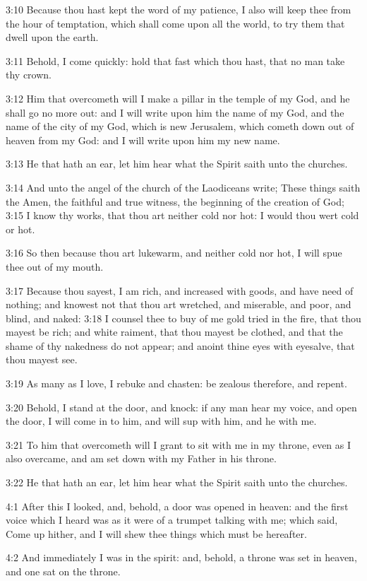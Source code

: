 3:10 Because thou hast kept the word of my patience, I also will keep
thee from the hour of temptation, which shall come upon all the world,
to try them that dwell upon the earth.

3:11 Behold, I come quickly: hold that fast which thou hast, that no
man take thy crown.

3:12 Him that overcometh will I make a pillar in the temple of my God,
and he shall go no more out: and I will write upon him the name of my
God, and the name of the city of my God, which is new Jerusalem, which
cometh down out of heaven from my God: and I will write upon him my
new name.

3:13 He that hath an ear, let him hear what the Spirit saith unto the
churches.

3:14 And unto the angel of the church of the Laodiceans write; These
things saith the Amen, the faithful and true witness, the beginning of
the creation of God; 3:15 I know thy works, that thou art neither cold
nor hot: I would thou wert cold or hot.

3:16 So then because thou art lukewarm, and neither cold nor hot, I
will spue thee out of my mouth.

3:17 Because thou sayest, I am rich, and increased with goods, and
have need of nothing; and knowest not that thou art wretched, and
miserable, and poor, and blind, and naked: 3:18 I counsel thee to buy
of me gold tried in the fire, that thou mayest be rich; and white
raiment, that thou mayest be clothed, and that the shame of thy
nakedness do not appear; and anoint thine eyes with eyesalve, that
thou mayest see.

3:19 As many as I love, I rebuke and chasten: be zealous therefore,
and repent.

3:20 Behold, I stand at the door, and knock: if any man hear my voice,
and open the door, I will come in to him, and will sup with him, and
he with me.

3:21 To him that overcometh will I grant to sit with me in my throne,
even as I also overcame, and am set down with my Father in his throne.

3:22 He that hath an ear, let him hear what the Spirit saith unto the
churches.

4:1 After this I looked, and, behold, a door was opened in heaven: and
the first voice which I heard was as it were of a trumpet talking with
me; which said, Come up hither, and I will shew thee things which must
be hereafter.

4:2 And immediately I was in the spirit: and, behold, a throne was set
in heaven, and one sat on the throne.

